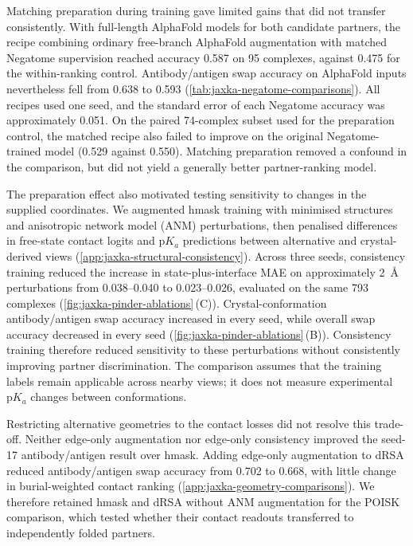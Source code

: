 Matching preparation during training gave limited gains that did not transfer consistently. With full-length AlphaFold models for both candidate partners, the recipe combining ordinary free-branch AlphaFold augmentation with matched Negatome supervision reached accuracy 0.587 on 95 complexes, against 0.475 for the within-ranking control. Antibody/antigen swap accuracy on AlphaFold inputs nevertheless fell from 0.638 to 0.593 (\cref{tab:jaxka-negatome-comparisons}). All recipes used one seed, and the standard error of each Negatome accuracy was approximately 0.051. On the paired 74-complex subset used for the preparation control, the matched recipe also failed to improve on the original Negatome-trained model (0.529 against 0.550). Matching preparation removed a confound in the comparison, but did not yield a generally better partner-ranking model.

The preparation effect also motivated testing sensitivity to changes in the supplied coordinates. We augmented hmask training with minimised structures and anisotropic network model (ANM) perturbations, then penalised differences in free-state contact logits and $\mathrm{p}K_a$ predictions between alternative and crystal-derived views (\cref{app:jaxka-structural-consistency}). Across three seeds, consistency training reduced the increase in state-plus-interface MAE on approximately 2~\AA{} perturbations from 0.038--0.040 to 0.023--0.026, evaluated on the same 793 complexes (\cref{fig:jaxka-pinder-ablations}\,(C)). Crystal-conformation antibody/antigen swap accuracy increased in every seed, while overall swap accuracy decreased in every seed (\cref{fig:jaxka-pinder-ablations}\,(B)). Consistency training therefore reduced sensitivity to these perturbations without consistently improving partner discrimination. The comparison assumes that the training labels remain applicable across nearby views; it does not measure experimental $\mathrm{p}K_a$ changes between conformations.

Restricting alternative geometries to the contact losses did not resolve this trade-off. Neither edge-only augmentation nor edge-only consistency improved the seed-17 antibody/antigen result over hmask. Adding edge-only augmentation to dRSA reduced antibody/antigen swap accuracy from 0.702 to 0.668, with little change in burial-weighted contact ranking (\cref{app:jaxka-geometry-comparisons}). We therefore retained hmask and dRSA without ANM augmentation for the POISK comparison, which tested whether their contact readouts transferred to independently folded partners.

